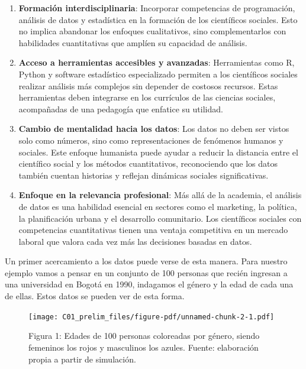 \documentclass[
  letterpaper,
  DIV=11,
  numbers=noendperiod]{scrreprt}
\begin{document}
\begin{enumerate}
\def\labelenumi{\arabic{enumi}.}
\item
  \textbf{Formación interdisciplinaria}: Incorporar competencias de
  programación, análisis de datos y estadística en la formación de los
  científicos sociales. Esto no implica abandonar los enfoques
  cualitativos, sino complementarlos con habilidades cuantitativas que
  amplíen su capacidad de análisis.
\item
  \textbf{Acceso a herramientas accesibles y avanzadas}: Herramientas
  como R, Python y software estadístico especializado permiten a los
  científicos sociales realizar análisis más complejos sin depender de
  costosos recursos. Estas herramientas deben integrarse en los
  currículos de las ciencias sociales, acompañadas de una pedagogía que
  enfatice su utilidad.
\item
  \textbf{Cambio de mentalidad hacia los datos}: Los datos no deben ser
  vistos solo como números, sino como representaciones de fenómenos
  humanos y sociales. Este enfoque humanista puede ayudar a reducir la
  distancia entre el científico social y los métodos cuantitativos,
  reconociendo que los datos también cuentan historias y reflejan
  dinámicas sociales significativas.
\item
  \textbf{Enfoque en la relevancia profesional}: Más allá de la
  academia, el análisis de datos es una habilidad esencial en sectores
  como el marketing, la política, la planificación urbana y el
  desarrollo comunitario. Los científicos sociales con competencias
  cuantitativas tienen una ventaja competitiva en un mercado laboral que
  valora cada vez más las decisiones basadas en datos.
\end{enumerate}

Un primer acercamiento a los datos puede verse de esta manera. Para
nuestro ejemplo vamos a pensar en un conjunto de 100 personas que recién
ingresan a una universidad en Bogotá en 1990, indagamos el género y la
edad de cada una de ellas. Estos datos se pueden ver de esta forma.

\begin{figure}[H]

{\centering \texttt{[image: C01\_prelim\_files/figure-pdf/unnamed-chunk-2-1.pdf]}

}

\caption{Figura 1: Edades de 100 personas coloreadas por género, siendo
femeninos los rojos y masculinos los azules. Fuente: elaboración propia
a partir de simulación.}

\end{figure}%
\end{document}
